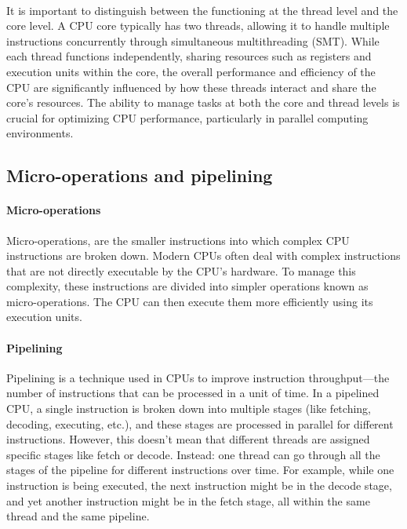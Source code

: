     \paragraph*{}
    It is important to distinguish between the functioning at the thread level and the core level. 
    A CPU core typically has two threads, allowing it to handle multiple instructions concurrently through 
    simultaneous multithreading (SMT). While each thread functions independently, sharing resources such as 
    registers and execution units within the core, the overall performance and efficiency of the CPU are significantly 
    influenced by how these threads interact and share the core’s resources. The ability to manage tasks at both the 
    core and thread levels is crucial for optimizing CPU performance, particularly in parallel computing environments.
    \par


\subsection{Micro-operations and pipelining}

    \paragraph*{Micro-operations} 
    Micro-operations, are the smaller instructions into which complex CPU
    instructions are broken down. Modern CPUs often deal with complex instructions that are not directly 
    executable by the CPU’s hardware. To manage this complexity, these instructions are divided into simpler 
    operations known as micro-operations. The CPU can then execute them more efficiently using its execution units.
    \par
    
    \paragraph*{Pipelining} 
    Pipelining is a technique used in CPUs to improve instruction throughput—the number of 
    instructions that can be processed in a unit of time. In a pipelined CPU, a single instruction is broken down into multiple 
    stages (like fetching, decoding, executing, etc.), and these stages are processed in parallel for different instructions. 
    However, this doesn't mean that different threads are assigned specific stages like fetch or decode. Instead: one thread can go 
    through all the stages of the pipeline for different instructions over time. For example, while one instruction is being 
    executed, the next instruction might be in the decode stage, and yet another instruction might be in the fetch stage, all 
    within the same thread and the same pipeline.
    \par



